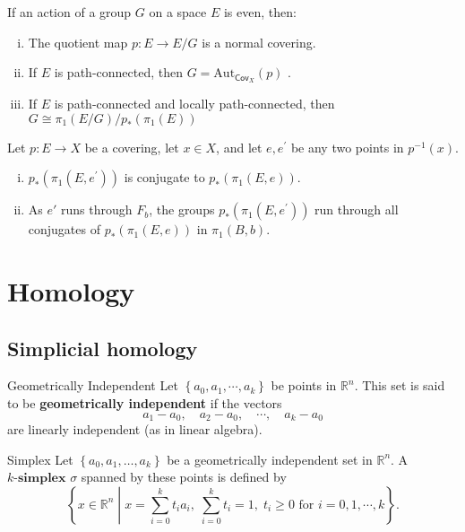 \documentclass{report}
\begin{document}
\begin{proposition}{}{}
	If an action of a group $G$ on a space $E$ is even, then:
	\begin{enumerate}[(i)]
		\item The quotient map $p: E \rightarrow E / G$ is a normal covering.
		\item If $E$ is path-connected, then $G=\mathrm{Aut}_{\mathsf{Cov}_X}(p)$ .
		\item If $E$ is path-connected and locally path-connected, then $G\cong\pi_1(E / G) / p_*\left(\pi_1(E)\right)$
	\end{enumerate}
\end{proposition}



\begin{proposition}{}{}
	Let $p: E \to X$ be a covering, let $x \in X$, and let $e, e^{\prime}$ be any two points in $p^{-1}(x)$.
	\begin{enumerate}[(i)]
		\item $p_*\left(\pi_1\left(E, e^{\prime}\right)\right)$ is conjugate to $p_*\left(\pi_1(E, e)\right)$.
		\item As $e'$ runs through $F_b$, the groups $p_*\left(\pi_1\left(E, e^{\prime}\right)\right)$ run through all conjugates of $p_*\left(\pi_1(E, e)\right)$ in $\pi_1(B, b)$.
	\end{enumerate}
\end{proposition}

\begin{prf}

\end{prf}

\chapter{Homology}
\section{Simplicial homology}

\begin{definition}{Geometrically Independent}{}
	Let $\left\{a_0, a_1, \cdots, a_k\right\}$ be points in $\mathbb{R}^n$. This set is said to be \textbf{geometrically independent} if the vectors
	$$
		a_1-a_0, \quad a_2-a_0, \quad \cdots, \quad a_k-a_0
	$$
	are linearly independent (as in linear algebra).
\end{definition}


\begin{definition}{Simplex}{}
	Let $\left\{a_0, a_1, \ldots, a_k\right\}$ be a geometrically independent set in $\mathbb{R}^n$. A $\textbf{$k$-simplex } \sigma$ spanned by these points is defined by
	$$
		\left\{x\in \mathbb{R}^n\;\left|\; x=\sum_{i=0}^k t_i a_i,\;\sum_{i=0}^k t_i=1,\;t_i \geq 0\text{ for }i = 0,1,\cdots, k\right.\right\}.
	$$
\end{definition}
\end{document}
